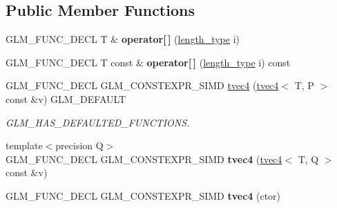 \subsection*{Public Member Functions}
\begin{DoxyCompactItemize}
\item 
\mbox{\label{structglm_1_1tvec4_a036a73844fb59380b1149744e1ddd2b2}} 
G\+L\+M\+\_\+\+F\+U\+N\+C\+\_\+\+D\+E\+CL T \& {\bfseries operator\mbox{[}$\,$\mbox{]}} (\hyperlink{structglm_1_1tvec4_a4e2b34a427cac7e72b6f73173c206feb}{length\+\_\+type} i)
\item 
\mbox{\label{structglm_1_1tvec4_a60e973c729bf1808c343905ea3208148}} 
G\+L\+M\+\_\+\+F\+U\+N\+C\+\_\+\+D\+E\+CL T const  \& {\bfseries operator\mbox{[}$\,$\mbox{]}} (\hyperlink{structglm_1_1tvec4_a4e2b34a427cac7e72b6f73173c206feb}{length\+\_\+type} i) const
\item 
\mbox{\label{structglm_1_1tvec4_a63f627d6a023b26259e749afc7253f2c}} 
G\+L\+M\+\_\+\+F\+U\+N\+C\+\_\+\+D\+E\+CL G\+L\+M\+\_\+\+C\+O\+N\+S\+T\+E\+X\+P\+R\+\_\+\+S\+I\+MD \hyperlink{structglm_1_1tvec4_a63f627d6a023b26259e749afc7253f2c}{tvec4} (\hyperlink{structglm_1_1tvec4}{tvec4}$<$ T, P $>$ const \&v) G\+L\+M\+\_\+\+D\+E\+F\+A\+U\+LT
\begin{DoxyCompactList}\small\item\em G\+L\+M\+\_\+\+H\+A\+S\+\_\+\+D\+E\+F\+A\+U\+L\+T\+E\+D\+\_\+\+F\+U\+N\+C\+T\+I\+O\+NS. \end{DoxyCompactList}\item 
\mbox{\label{structglm_1_1tvec4_aa2e87b9ff21cb646a4c0ca4c848c7570}} 
{\footnotesize template$<$precision Q$>$ }\\G\+L\+M\+\_\+\+F\+U\+N\+C\+\_\+\+D\+E\+CL G\+L\+M\+\_\+\+C\+O\+N\+S\+T\+E\+X\+P\+R\+\_\+\+S\+I\+MD {\bfseries tvec4} (\hyperlink{structglm_1_1tvec4}{tvec4}$<$ T, Q $>$ const \&v)
\item 
\mbox{\label{structglm_1_1tvec4_a9b01006ba780e0bc5858eca39f9e10f7}} 
G\+L\+M\+\_\+\+F\+U\+N\+C\+\_\+\+D\+E\+CL G\+L\+M\+\_\+\+C\+O\+N\+S\+T\+E\+X\+P\+R\+\_\+\+S\+I\+MD {\bfseries tvec4} (ctor)
\item 
\mbox{\label{structglm_1_1tvec4_acf5257ae317d955cb7dec58f76369539}} 

\end{DoxyCompactItemize}
